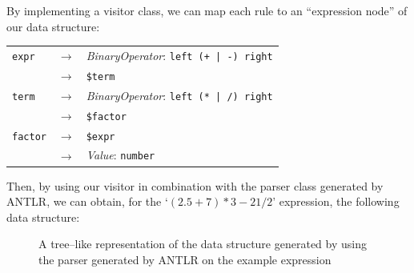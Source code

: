 \documentclass[]{usiinfbachelorproject}
\begin{document}
By implementing a visitor class, we can map each rule to an ``expression node''
of our data structure:

\vspace{1em}

\begin{tabular}{lcl}
\texttt{expr}   & $ \to $ & \textit{BinaryOperator}: \texttt{left (+ | -) right} \\
                & $ \to $ & \texttt{\$term} \\
\texttt{term}   & $ \to $ & \textit{BinaryOperator}: \texttt{left (* | /) right} \\
                & $ \to $ & \texttt{\$factor} \\
\texttt{factor} & $ \to $ & \texttt{\$expr} \\
                & $ \to $ & \textit{Value}: \texttt{number}\\
\end{tabular}

\vspace{1em}

Then, by using our visitor in combination with the parser class generated by
ANTLR, we can obtain, for the `$ (2.5 + 7) * 3 - 21 / 2 $' expression, the
following data structure:

\begin{figure}[ht]
\centering
{}
\caption{A tree–like representation of the data structure generated
by using the parser generated by ANTLR on the example expression}
\end{figure}
\end{document}
